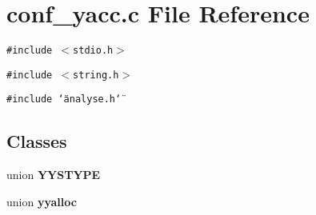 \section{conf\_\-yacc.c File Reference}
\label{conf__yacc_8c}
{\tt \#include $<$stdio.h$>$}\par
{\tt \#include $<$string.h$>$}\par
{\tt \#include \char`\"{}analyse.h\char`\"{}}\par
\subsection*{Classes}
\begin{CompactItemize}
\item 
union {\bf YYSTYPE}
\item 
union {\bf yyalloc}
\end{CompactItemize}
